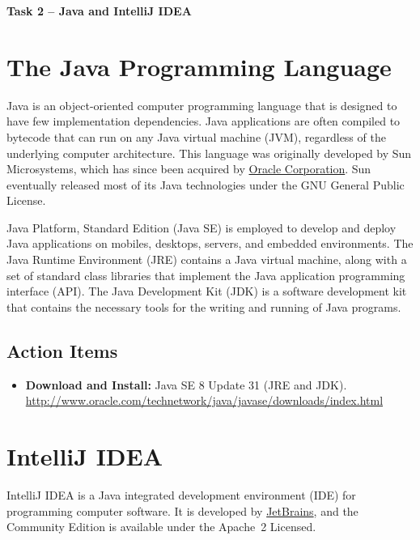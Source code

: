 \documentclass[11pt]{article}
\begin{document}
\begin{center}
{\bfseries \LARGE Task 2 -- Java and IntelliJ IDEA}
\end{center}

\section{The Java Programming Language}

Java is an object-oriented computer programming language that is designed to have few implementation dependencies.
Java applications are often compiled to bytecode that can run on any Java virtual machine (JVM), regardless of the underlying computer architecture.
This language was originally developed by Sun Microsystems, which has since been acquired by \href{http://www.oracle.com}{Oracle Corporation}.
Sun eventually released most of its Java technologies under the GNU General Public License.

Java Platform, Standard Edition (Java SE) is employed to develop and deploy Java applications on mobiles, desktops, servers, and embedded environments.
The Java Runtime Environment (JRE) contains a Java virtual machine, along with a set of standard class libraries that implement the Java application programming interface (API).
The Java Development Kit (JDK) is a software development kit that contains the necessary tools for the writing and running of Java programs.

\subsection*{Action Items}

\begin{itemize}
\item \textbf{Download and Install:} Java SE 8 Update 31 (JRE and JDK). \\
\url{http://www.oracle.com/technetwork/java/javase/downloads/index.html}
\end{itemize}


\section{IntelliJ IDEA}

IntelliJ IDEA is a Java integrated development environment (IDE) for programming computer software.
It is developed by \href{https://www.jetbrains.com}{JetBrains}, and the Community Edition is available under the Apache~2 Licensed.
\end{document}
